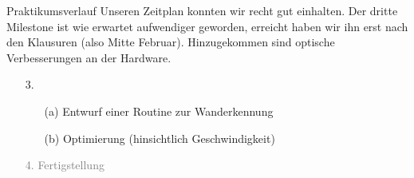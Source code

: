 \documentclass{beamer}
\begin{document}
\begin{frame}[fragile,t]{Praktikumsverlauf}
Unseren Zeitplan konnten wir recht gut einhalten. Der dritte Milestone ist wie erwartet aufwendiger geworden, erreicht haben wir ihn erst nach den Klausuren (also Mitte Februar). Hinzugekommen sind optische Verbesserungen an der Hardware. 

\smallskip
\begin{enumerate}
 \item[3.] 
 \begin{enumerate}
 \item[(a)] Entwurf einer Routine zur Wanderkennung
 \item[(b)] Optimierung (hinsichtlich Geschwindigkeit)
 \end{enumerate}
 \item[\textcolor{gray}{4.}] \textcolor{gray}{Fertigstellung}
\end{enumerate}
\end{frame}
\end{document}
